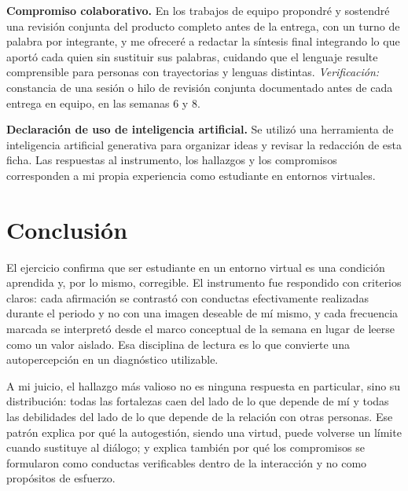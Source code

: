 \documentclass[
  spanish,
  letterpaper, oneside
]{article}
\begin{document}
\begin{fichabox}[title={Ficha de recuperación de mi Brújula de Interaprendizaje}]
\medskip
\textbf{Compromiso colaborativo.} En los trabajos de equipo propondré y sostendré una
revisión conjunta del producto completo antes de la entrega, con un turno de palabra
por integrante, y me ofreceré a redactar la síntesis final integrando lo que aportó
cada quien sin sustituir sus palabras, cuidando que el lenguaje resulte comprensible
para personas con trayectorias y lenguas distintas. \textit{Verificación:} constancia
de una sesión o hilo de revisión conjunta documentado antes de cada entrega en
equipo, en las semanas 6 y 8.

\medskip
\textbf{Declaración de uso de inteligencia artificial.} Se utilizó una herramienta de
inteligencia artificial generativa para organizar ideas y revisar la redacción de
esta ficha. Las respuestas al instrumento, los hallazgos y los compromisos
corresponden a mi propia experiencia como estudiante en entornos virtuales.
\end{fichabox}

\clearpage
\section{Conclusión}

El ejercicio confirma que ser estudiante en un entorno virtual es una condición
aprendida y, por lo mismo, corregible. El instrumento fue respondido con criterios
claros: cada afirmación se contrastó con conductas efectivamente realizadas durante
el periodo y no con una imagen deseable de mí mismo, y cada frecuencia marcada se
interpretó desde el marco conceptual de la semana en lugar de leerse como un valor
aislado. Esa disciplina de lectura es lo que convierte una autopercepción en un
diagnóstico utilizable.

A mi juicio, el hallazgo más valioso no es ninguna respuesta en particular, sino su
distribución: todas las fortalezas caen del lado de lo que depende de mí y todas las
debilidades del lado de lo que depende de la relación con otras personas. Ese patrón
explica por qué la autogestión, siendo una virtud, puede volverse un límite cuando
sustituye al diálogo; y explica también por qué los compromisos se formularon como
conductas verificables dentro de la interacción y no como propósitos de esfuerzo.
\end{document}
